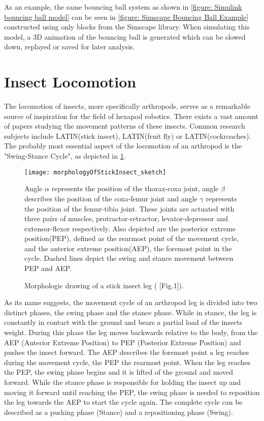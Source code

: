 As an example, the same bouncing ball system as shown in \ref{figure: Simulink bouncing ball model} can be seen in \ref{figure: Simscape Bouncing Ball Example} constructed using only blocks from the Simscape library. When simulating this model, a 3D animation of the bouncing ball is generated which can be slowed down, replayed or saved for later analysis.


\section{Insect Locomotion}
The locomotion of insects, more specifically arthropods, serves as a remarkable source of inspiration for the field of hexapod robotics.
There exists a vast amount of papers studying the movement patterns of these insects.
Common research subjects include LATIN(stick insect), LATIN(fruit fly) or LATIN(cockroaches).
The probably most essential aspect of the locomotion of an arthropod is the "Swing-Stance Cycle", as depicted in \ref{figure: Stick insect leg}.


\begin{figure}[h]
	\centerline{\texttt{[image: morphologyOfStickInsect\_sketch]}}
	\caption{Morphologic drawing of a stick insect leg (\cite{schilling2013walknet} [Fig.1]).}
	\begin{footnotesize}
		Angle $\alpha$ represents the position of the thorax-coxa joint, angle $\beta$ describes the position of the coxa-femur joint and angle $\gamma$ represents the position of the femur-tibia joint.
		These joints are actuated with three pairs of muscles, protractor-retractor, levator-depressor and extensor-flexor respectively.
		Also depicted are the posterior extreme position(PEP), defined as the rearmost point of the movement cycle, and the anterior extreme position(AEP), the foremost point in the cycle.
		Dashed lines depict the swing and stance movement between PEP and AEP.
	\end{footnotesize}
	
	\label{figure: Stick insect leg}
\end{figure}

As its name suggests, the movement cycle of an arthropod leg is divided into two distinct phases, the swing phase and the stance phase.
While in stance, the leg is constantly in contact with the ground and bears a partial load of the insects weight.
During this phase the leg moves backwards relative to the body, from the AEP (Anterior Extreme Position) to PEP (Posterior Extreme Position) and pushes the insect forward.
The AEP describes the foremost point a leg reaches during the movement cycle, the PEP the rearmost point.
When the leg reaches the PEP, the swing phase begins and it is lifted of the ground and moved forward.
While the stance phase is responsible for holding the insect up and moving it forward until reaching the PEP, the swing phase is needed to reposition the leg towards the AEP to start the cycle again.
The complete cycle can be described as a pushing phase (Stance) and a repositioning phase (Swing).


